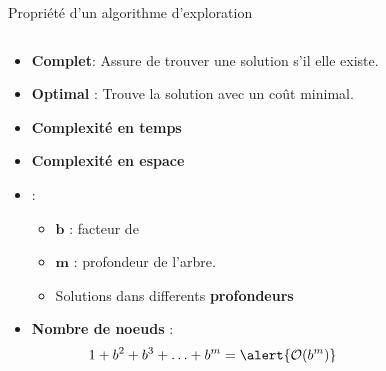 \documentclass{beamer}
\begin{document}
\begin{frame}[t]{Propriété d'un algorithme d'exploration}
 \begin{columns}
   \begin{column}{0.5\textwidth}
     \begin{itemize}
       \small
       \item<1-> \textbf{Complet}: Assure de trouver une solution s'il elle
       existe. 
     \item<2-> \textbf{Optimal} : Trouve la solution avec un \alert{coût}
       minimal.
      \item<3-> \textbf{Complexité en temps} 
      \item<4-> \textbf{Complexité en espace} 
     \end{itemize} 

     \begin{itemize}
       \item {}:
         \begin{itemize}
           \small
           \item<5-> $\mathbf{b}$ : facteur de 
           \item<6->$\mathbf{m}$ : profondeur de l'arbre.
          \item<7-> Solutions dans differents \textbf{profondeurs} 
         \end{itemize}
       \item<8->
\textbf{Nombre de noeuds} :
          \scriptsize 
          $$ 1 + b^2 + b^3 + \ldots +b^m = \alert{\mathcal{O}(b^m)}$$
     \end{itemize}
   \end{column}
   \begin{column}{0.5\textwidth}
     \begin{figure}[htpb]
     \begin{center}
\end{center}
\end{figure}
\end{column}
\end{columns}
\end{frame}
\end{document}
